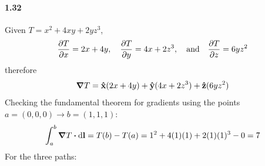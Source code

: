 \documentclass[../main.tex]{subfiles}
\begin{document}
\paragraph{1.32}
Given $T = x^2 + 4xy + 2yz^3$,
\begin{align*}
    \pdv{T}{x} = 2x + 4y  ,\quad     \pdv{T}{y} = 4x + 2z^3  ,\qand   \pdv{T}{z} = 6yz^2
\end{align*}
therefore
\begin{align*}
    \grad{T} = \vu{x}(2x + 4y) + \vu{y}(4x + 2z^3) + \vu{z}(6yz^2)
\end{align*}
Checking the fundamental theorem for gradients using the points $a = (0,0,0) \to b = (1,1,1)$:
\begin{align*}
    \int_a^b \grad{T} \vdot \dd{\vb{l}} = T(b) - T(a) = 1^2 + 4(1)(1) + 2(1)(1)^3 - 0 = 7
\end{align*}
For the three paths:
\end{document}
